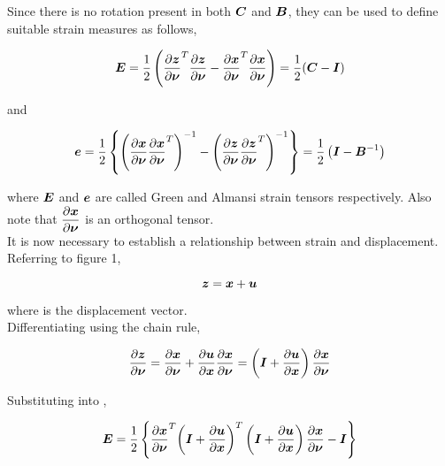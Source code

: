 Since there is no rotation present in both $\matr{C}$ and $\matr{B}$, they can
be used to define suitable strain measures as follows,

\begin{equation}
  \matr{E}=\frac{1}{2}\pbrac{\transpose{\delby{\vect{z}}{\vect{\nu}}}\delby{\vect{z}}{\vect{\nu}}-
                       \transpose{\delby{\vect{x}}{\vect{\nu}}}\delby{\vect{x}}{\vect{\nu}}}=
	    \frac{1}{2}(\matr{C}-\matr{I})	       
  \label{eqn:greenstrain}
\end{equation}

\noindent and

\begin{equation}
  \vect{e}=\frac{1}{2}\bbrac{\pbrac{\delby{\vect{x}}{\vect{\nu}}\transpose{\delby{\vect{x}}{\vect{\nu}}}}^{-1}-
                             \pbrac{\delby{\vect{z}}{\vect{\nu}}\transpose{\delby{\vect{z}}{\vect{\nu}}}}^{-1}}=
			     \frac{1}{2}\pbrac{\matr{I}-\matr{B}^{-1}}  
  \label{eqn:almansistrain}
\end{equation}

\noindent where $\matr{E}$ and $\vect{e}$ are called Green and Almansi strain tensors respectively. 
Also note that $\delby{\vect{x}}{\vect{\nu}}$ is an orthogonal tensor. \\

It is now necessary to establish a relationship between strain and displacement. Referring to figure 1, 

\begin{equation}
  \vect{z}=\vect{x}+\vect{u}
  \label{eqn:displacement}
\end{equation}

\noindent where  is the displacement vector. \\

\noindent Differentiating  using the chain rule,

\begin{equation}
  \delby{\vect{z}}{\vect{\nu}}=\delby{\vect{x}}{\vect{\nu}}+\delby{\vect{u}}{\vect{x}}\delby{\vect{x}}{\vect{\nu}}=
                               \pbrac{\matr{I}+\delby{\vect{u}}{\vect{x}}}\delby{\vect{x}}{\vect{\nu}}  
  \label{eqn:displacementgradient}
\end{equation}

\noindent Substituting  into ,

\begin{equation}
  \matr{E}=\frac{1}{2}\bbrac{\transpose{\delby{\vect{x}}{\vect{\nu}}}\transpose{\pbrac{\matr{I}+\delby{\vect{u}}{\vect{x}}}}
                  \pbrac{\matr{I}+\delby{\vect{u}}{\vect{x}}}\delby{\vect{x}}{\vect{\nu}}-\matr{I}}
  \label{eqn:greendisplacement1}
\end{equation}

